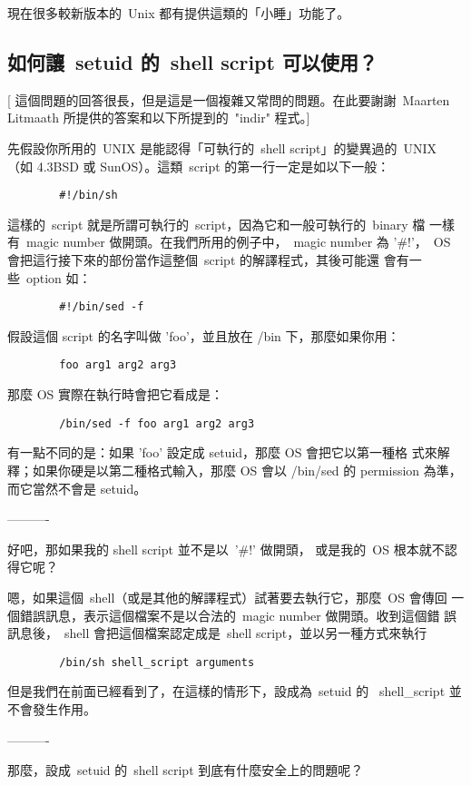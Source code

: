\documentclass{article}
\begin{document}
\begin{CJK*}{Bg5}{ming}
	現在很多較新版本的~Unix 都有提供這類的「小睡」功能了。

\subsection{如何讓~setuid 的~shell script 可以使用？}

	[ 這個問題的回答很長，但是這是一個複雜又常問的問題。在此要謝謝~Maarten 
	Litmaath 所提供的答案和以下所提到的~"indir" 程式。]

	先假設你所用的~UNIX 是能認得「可執行的~shell script」的變異過的~UNIX
       （如 4.3BSD 或 SunOS）。這類~script 的第一行一定是如以下一般：
\begin{verbatim}
		#!/bin/sh
\end{verbatim}
	這樣的~script 就是所謂可執行的~script，因為它和一般可執行的~binary 檔
        一樣有~magic number 做開頭。在我們所用的例子中，~magic number 為 
        '\#!'，~OS 會把這行接下來的部份當作這整個~script 的解譯程式，其後可能還
        會有一些~option 如：
\begin{verbatim}
		#!/bin/sed -f
\end{verbatim}
	假設這個 script 的名字叫做 'foo'，並且放在 /bin 下，那麼如果你用：
\begin{verbatim}
		foo arg1 arg2 arg3
\end{verbatim}
	那麼 OS 實際在執行時會把它看成是：
\begin{verbatim}
		/bin/sed -f foo arg1 arg2 arg3
\end{verbatim}
	有一點不同的是：如果 'foo' 設定成 setuid，那麼 OS 會把它以第一種格
        式來解釋；如果你硬是以第二種格式輸入，那麼 OS 會以 /bin/sed 的 
        permission 為準，而它當然不會是 setuid。

        ----------

	好吧，那如果我的 shell script 並不是以~'\#!' 做開頭，
	或是我的~OS 根本就不認得它呢？

	嗯，如果這個~shell（或是其他的解譯程式）試著要去執行它，那麼~OS 會傳回
	一個錯誤訊息，表示這個檔案不是以合法的~magic number 做開頭。收到這個錯
	誤訊息後，~shell 會把這個檔案認定成是~shell script，並以另一種方式來執行
\begin{verbatim}
		/bin/sh shell_script arguments
\end{verbatim}
	但是我們在前面已經看到了，在這樣的情形下，設成為~setuid 的 
        ~shell\_script 並不會發生作用。

        ----------

	那麼，設成~setuid 的~shell script 到底有什麼安全上的問題呢？


\end{CJK*}
\end{document}
